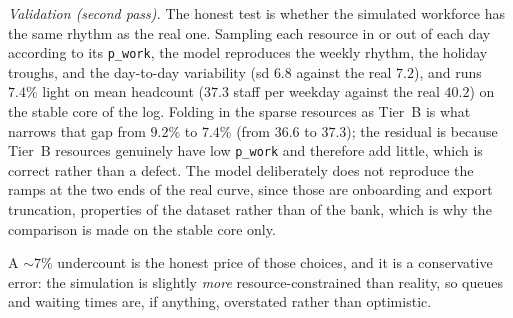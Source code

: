 \emph{Validation (second pass).} The honest test is whether the simulated
workforce has the same rhythm as the real one. Sampling each resource in or out
of each day according to its \texttt{p\_work}, the model reproduces the weekly
rhythm, the holiday troughs, and the day-to-day variability (sd $6.8$ against
the real $7.2$), and runs $7.4\%$ light on mean headcount ($37.3$ staff per
weekday against the real $40.2$) on the stable core of the log. Folding in the
sparse resources as Tier~B is what narrows that gap from $9.2\%$ to $7.4\%$
(from $36.6$ to $37.3$); the residual is because Tier~B resources genuinely
have low \texttt{p\_work} and therefore add little, which is correct rather
than a defect. The model deliberately does not reproduce the ramps at the two
ends of the real curve, since those are onboarding and export truncation,
properties of the dataset rather than of the bank, which is why the comparison
is made on the stable core only.

%
%
%
A $\sim\!7\%$ undercount is the honest price of those choices, and it is a
conservative error: the simulation is slightly \emph{more} resource-constrained
than reality, so queues and waiting times are, if anything, overstated rather
than optimistic.

